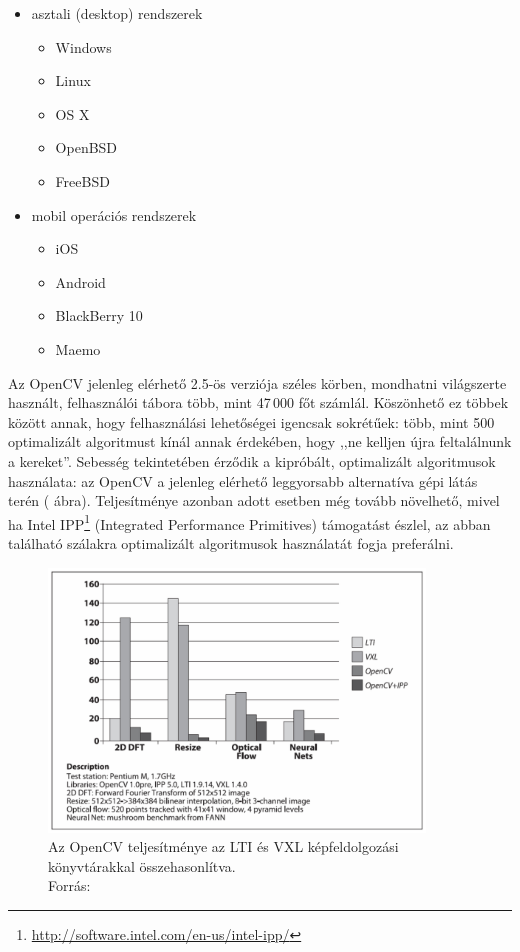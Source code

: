 \begin{itemize}
  \item asztali (desktop) rendszerek
  \begin{itemize}
    \item Windows
    \item Linux
    \item OS X
    \item OpenBSD
    \item FreeBSD  
  \end{itemize}
  \item mobil operációs rendszerek
  \begin{itemize}
    \item iOS
    \item Android
    \item BlackBerry 10
    \item Maemo
  \end{itemize}   
\end{itemize}

Az OpenCV jelenleg elérhető 2.5-ös verziója széles körben, mondhatni világszerte használt, felhasználói tábora több, mint 47\,000 főt számlál. Köszönhető ez többek között annak, hogy felhasználási lehetőségei igencsak sokrétűek: több, mint 500 optimalizált algoritmust kínál annak érdekében, hogy ,,ne kelljen újra feltalálnunk a kereket''. Sebesség tekintetében érződik a kipróbált, optimalizált algoritmusok használata: az OpenCV a jelenleg elérhető leggyorsabb alternatíva gépi látás terén ( ábra). Teljesítménye azonban adott esetben még tovább növelhető, mivel ha Intel IPP\footnote{\url{http://software.intel.com/en-us/intel-ipp/}} (Integrated Performance Primitives) támogatást észlel, az abban található szálakra optimalizált algoritmusok használatát fogja preferálni.

\begin{figure}[!ht]
\centering
\includegraphics[width=100mm, keepaspectratio]{figures/opencv_speed.png}
\caption{Az OpenCV teljesítménye az LTI és VXL képfeldolgozási könyvtárakkal összehasonlítva.\\Forrás: \cite{opencv_book}}
\label{fig:opencv_speed}
\end{figure}

